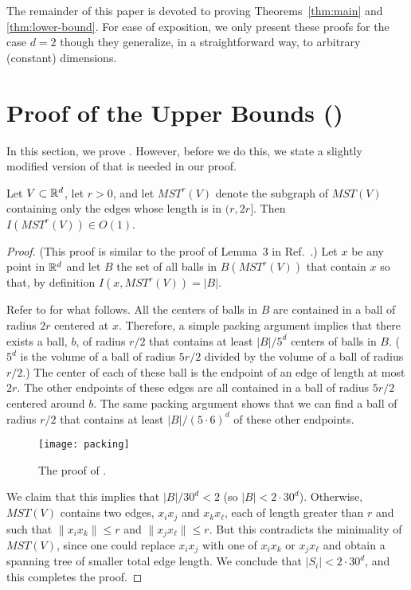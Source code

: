\documentclass{patmorin}
\newcommand{\mst}{\mathit{MST}}
\begin{document}
The remainder of this paper is devoted to proving Theorems~\ref{thm:main}
and \ref{thm:lower-bound}.  For ease of exposition, we only present these
proofs for the case $d=2$ though they generalize, in a straightforward
way, to arbitrary (constant) dimensions.

\section{Proof of the Upper Bounds ()}

In this section, we prove .  However, before we do this,
we state a slightly modified version of  that is needed in
our proof.

\begin{lem}
  Let $V\subset\mathbb{R}^d$, let $r>0$, and let $\mst^r(V)$ denote the subgraph
  of $\mst(V)$ containing only the edges whose length is in $(r,2r]$.
  Then $I(\mst^r(V))\in O(1)$.
\end{lem}

\begin{proof}
(This proof is similar to the proof of Lemma~3 in Ref.~\cite{msz11}.)
Let $x$ be any point in $\mathbb{R}^d$ and let $B$ the set of all
balls in $B(\mst^r(V))$ that contain $x$ so that, by definition
$I(x,\mst^r(V))=|B|$.  

Refer to  for what follows.  All the centers of balls in
$B$ are contained in a ball of radius $2r$ centered at $x$.  Therefore,
a simple packing argument implies that there exists a ball, $b$, of
radius $r/2$ that contains at least $|B|/5^d$ centers of balls in $B$.
($5^d$ is the volume of a ball of radius $5r/2$ divided by the volume
of a ball of radius $r/2$.)  The center of each of these ball is the
endpoint of an edge of length at most $2r$.  The other endpoints of these
edges are all contained in a ball of radius $5r/2$ centered around $b$.
The same packing argument shows that we can find a ball of radius $r/2$
that contains at least $|B|/(5\cdot 6)^d$ of these other endpoints.

\begin{figure}
  \begin{center}
    \texttt{[image: packing]}
  \end{center}
  \caption{The proof of .}
\end{figure}

We claim that this implies that $|B|/30^d< 2$ (so $|B|< 2\cdot
30^d$). Otherwise, $\mst(V)$ contains two edges, $x_ix_j$ and $x_kx_\ell$,
each of length greater than $r$ and such that $\|x_ix_k\| \le r$ and
$\|x_jx_\ell\|\le r$.  But this contradicts the minimality of $\mst(V)$,
since one could replace $x_ix_j$ with one of $x_ix_k$ or $x_jx_\ell$
and obtain a spanning tree of smaller total edge length.  We conclude
that $|S_i|< 2\cdot 30^d$, and this completes the proof.
\end{proof}
\end{document}

